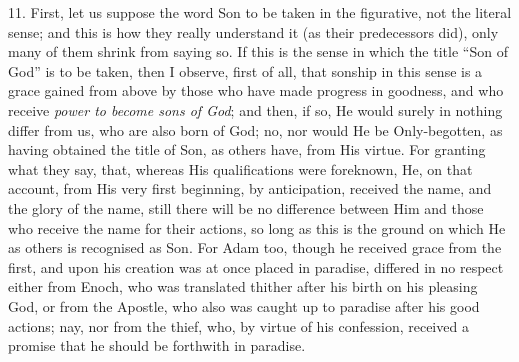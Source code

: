 11. First, let us suppose the
word Son to be taken in the figurative, not the literal sense; and
this is how they really understand it (as their predecessors did),
only many of them shrink from saying so. If this is the sense in which the title ``Son of God'' is to be taken, then I observe, first of
all, that sonship in this sense is a grace gained from above by those
who have made progress in goodness, and who receive \emph{power to become
sons of God}; and then, if so, He would surely in nothing differ
from us, who are also born of God; no, nor would He be Only-begotten,
as having obtained the title of Son, as others have, from His virtue.
For granting what they say, that, whereas His qualifications were
foreknown, He, on that account, from His very first beginning, by
anticipation, received the name, and the glory of the name, still
there will be no difference between Him and those who receive the name
for their actions, so long as this is the ground on which He as others
is recognised as Son. For Adam too, though he received grace from the
first, and upon his creation was at once placed in paradise, differed
in no respect either from Enoch, who was translated thither after his
birth on his pleasing God, or from the Apostle, who also was caught up
to paradise after his good actions; nay, nor from the thief, who, by
virtue of his confession, received a promise that he should be
forthwith in paradise.

